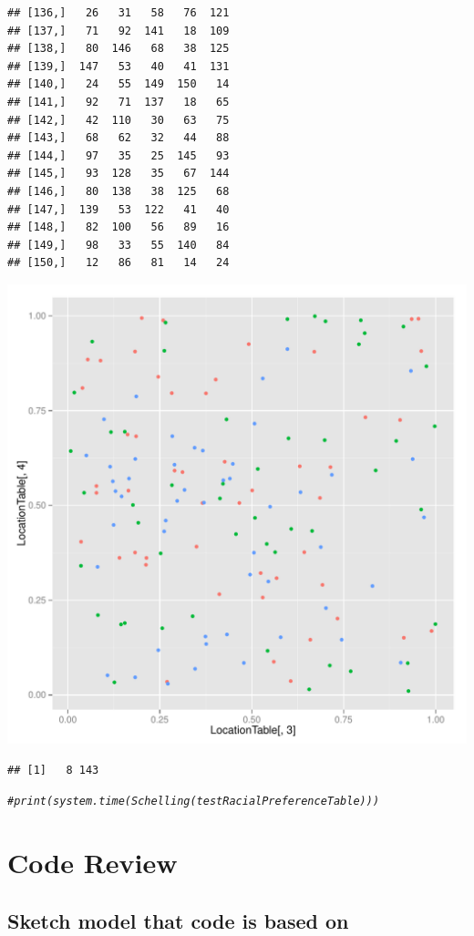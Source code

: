 \documentclass{article}\usepackage[]{graphicx}\usepackage[]{color}
\makeatletter
\def\maxwidth{ %
  \ifdim\Gin@nat@width>\linewidth
    \linewidth
  \else
    \Gin@nat@width
  \fi
}
\newcommand{\hlcom}[1]{\textcolor[rgb]{0.678,0.584,0.686}{\textit{#1}}}%
\newenvironment{kframe}{%
 \def\at@end@of@kframe{}%
 \ifinner\ifhmode%
  \def\at@end@of@kframe{\end{minipage}}%
  \begin{minipage}{\columnwidth}%
 \fi\fi%
 \def\FrameCommand##1{\hskip\@totalleftmargin \hskip-\fboxsep
 \colorbox{shadecolor}{##1}\hskip-\fboxsep
     \hskip-\linewidth \hskip-\@totalleftmargin \hskip\columnwidth}%
 \MakeFramed {\advance\hsize-\width
   \@totalleftmargin\z@ \linewidth\hsize
   \@setminipage}}%
 {\par\unskip\endMakeFramed%
 \at@end@of@kframe}
\newenvironment{knitrout}{}{} %
\makeatother
\begin{document}
\begin{knitrout}
\begin{kframe}
\begin{verbatim}
## [136,]   26   31   58   76  121
## [137,]   71   92  141   18  109
## [138,]   80  146   68   38  125
## [139,]  147   53   40   41  131
## [140,]   24   55  149  150   14
## [141,]   92   71  137   18   65
## [142,]   42  110   30   63   75
## [143,]   68   62   32   44   88
## [144,]   97   35   25  145   93
## [145,]   93  128   35   67  144
## [146,]   80  138   38  125   68
## [147,]  139   53  122   41   40
## [148,]   82  100   56   89   16
## [149,]   98   33   55  140   84
## [150,]   12   86   81   14   24
\end{verbatim}
\end{kframe}
\includegraphics[width=\maxwidth]{figure/unnamed-chunk-2-2} 
\begin{kframe}\begin{verbatim}
## [1]   8 143
\end{verbatim}
\begin{alltt}
\hlcom{# print(system.time(Schelling(testRacialPreferenceTable)))}
\end{alltt}
\end{kframe}
\end{knitrout}

\section{Code Review}
\subsection{Sketch model that code is based  on}
\end{document}
